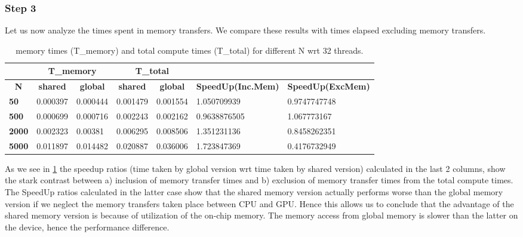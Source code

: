 \subsubsection*{Step 3}
Let us now analyze the times spent in memory transfers. We compare these results with times elapsed excluding memory transfers.\\
\begin{table}[h]
\centering
\begin{tabular}{@{}lllllll@{}}
  & \multicolumn{2}{c}{\textbf{T\_memory}}                                    & \multicolumn{2}{c}{\textbf{T\_total}}                                     & \textbf{}                                     & \textbf{}                                    \\
  \hline
  \multicolumn{1}{c}{\textbf{N}} & \multicolumn{1}{c}{\textbf{shared}} & \multicolumn{1}{c}{\textbf{global}} & \multicolumn{1}{c}{\textbf{shared}} & \multicolumn{1}{c}{\textbf{global}} & \multicolumn{1}{c}{\textbf{SpeedUp(Inc.Mem)}} & \multicolumn{1}{c}{\textbf{SpeedUp(ExcMem)}} \\
  \hline
  \textbf{50}                    & 0.000397                            & 0.000444                            & 0.001479                            & 0.001554                            & 1.050709939                                   & 0.9747747748                                 \\
  \textbf{500}                   & 0.000699                            & 0.000716                            & 0.002243                            & 0.002162                            & 0.9638876505                                  & 1.067773167                                  \\
  \textbf{2000}                  & 0.002323                            & 0.00381                             & 0.006295                            & 0.008506                            & 1.351231136                                   & 0.8458262351                                 \\
  \textbf{5000}                  & 0.011897                            & 0.014482                            & 0.020887                            & 0.036006                            & 1.723847369                                   & 0.4176732949                                
\end{tabular}
\caption{memory times (T\_memory) and total compute times (T\_total) for different N wrt 32 threads.}
\label{tab:speed-up}
\end{table}
As we see in \ref{tab:speed-up} the speedup ratios (time taken by global version wrt time taken by shared version) calculated in the last 2 columns, show the stark contrast between a) inclusion of memory transfer times and b) exclusion of memory transfer times from the total compute times. The SpeedUp ratios calculated in the latter case show that the shared memory version actually performs worse than the global memory version if we neglect the memory transfers taken place between CPU and GPU. Hence this allows us to conclude that the advantage of the shared memory version is because of utilization of the on-chip memory. The memory access from global memory is slower than the latter on the device, hence the performance difference.

